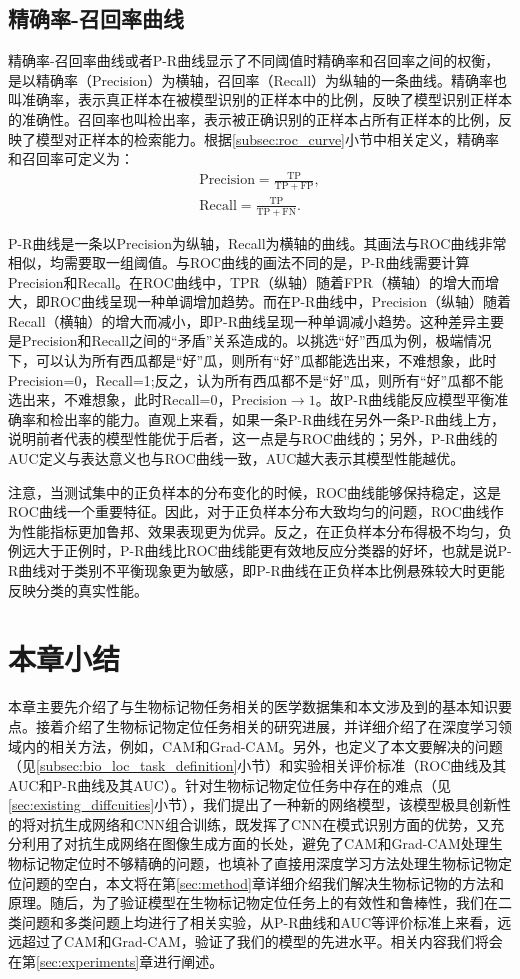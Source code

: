 \subsection{精确率-召回率曲线}
精确率-召回率曲线或者P-R曲线显示了不同阈值时精确率和召回率之间的权衡，是以精确率（Precision）为横轴，召回率（Recall）为纵轴的一条曲线。精确率也叫准确率，表示真正样本在被模型识别的正样本中的比例，反映了模型识别正样本的准确性。召回率也叫检出率，表示被正确识别的正样本占所有正样本的比例，反映了模型对正样本的检索能力。根据\ref{subsec:roc_curve}小节中相关定义，精确率和召回率可定义为：
\begin{gather}
	\mathrm{Precision}=\frac{\mathrm{TP}}{\mathrm{TP}+\mathrm{FP}},\\
	\mathrm{Recall}=\frac{\mathrm{TP}}{\mathrm{TP}+\mathrm{FN}}.
\end{gather}

P-R曲线是一条以Precision为纵轴，Recall为横轴的曲线。其画法与ROC曲线非常相似，均需要取一组阈值。与ROC曲线的画法不同的是，P-R曲线需要计算Precision和Recall。在ROC曲线中，TPR（纵轴）随着FPR（横轴）的增大而增大，即ROC曲线呈现一种单调增加趋势。而在P-R曲线中，Precision（纵轴）随着Recall（横轴）的增大而减小，即P-R曲线呈现一种单调减小趋势。这种差异主要是Precision和Recall之间的“矛盾”关系造成的。以挑选“好”西瓜为例，极端情况下，可以认为所有西瓜都是“好”瓜，则所有“好”瓜都能选出来，不难想象，此时Precision=0，Recall=1;反之，认为所有西瓜都不是“好”瓜，则所有“好”瓜都不能选出来，不难想象，此时Recall=0，Precision$\to 1$。故P-R曲线能反应模型平衡准确率和检出率的能力。直观上来看，如果一条P-R曲线在另外一条P-R曲线上方，说明前者代表的模型性能优于后者，这一点是与ROC曲线的；另外，P-R曲线的AUC定义与表达意义也与ROC曲线一致，AUC越大表示其模型性能越优。

注意，当测试集中的正负样本的分布变化的时候，ROC曲线能够保持稳定，这是ROC曲线一个重要特征。因此，对于正负样本分布大致均匀的问题，ROC曲线作为性能指标更加鲁邦、效果表现更为优异。反之，在正负样本分布得极不均匀，负例远大于正例时，P-R曲线比ROC曲线能更有效地反应分类器的好坏，也就是说P-R曲线对于类别不平衡现象更为敏感，即P-R曲线在正负样本比例悬殊较大时更能反映分类的真实性能。
\section{本章小结}
本章主要先介绍了与生物标记物任务相关的医学数据集和本文涉及到的基本知识要点。接着介绍了生物标记物定位任务相关的研究进展，并详细介绍了在深度学习领域内的相关方法，例如，CAM和Grad-CAM。另外，也定义了本文要解决的问题（见\ref{subsec:bio_loc_task_definition}小节）和实验相关评价标准（ROC曲线及其AUC和P-R曲线及其AUC）。针对生物标记物定位任务中存在的难点（见\ref{sec:existing_diffcuities}小节），我们提出了一种新的网络模型，该模型极具创新性的将对抗生成网络和CNN组合训练，既发挥了CNN在模式识别方面的优势，又充分利用了对抗生成网络在图像生成方面的长处，避免了CAM和Grad-CAM处理生物标记物定位时不够精确的问题，也填补了直接用深度学习方法处理生物标记物定位问题的空白，本文将在第\ref{sec:method}章详细介绍我们解决生物标记物的方法和原理。随后，为了验证模型在生物标记物定位任务上的有效性和鲁棒性，我们在二类问题和多类问题上均进行了相关实验，从P-R曲线和AUC等评价标准上来看，远远超过了CAM和Grad-CAM，验证了我们的模型的先进水平。相关内容我们将会在第\ref{sec:experiments}章进行阐述。